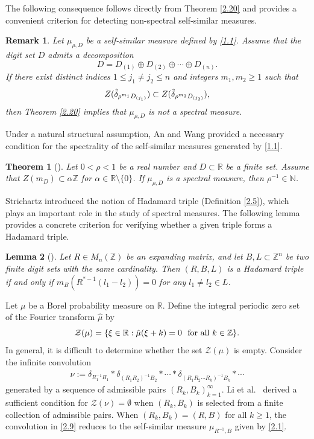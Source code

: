 \documentclass[11pt]{article}
\newtheorem{theorem}{Theorem}[section]
\newtheorem{lemma}[theorem]{Lemma}
\newtheorem{remark}{Remark}[section]
\numberwithin{equation}{section}
\begin{document}
The following consequence follows directly from Theorem \ref{2.20} and provides a convenient criterion for detecting non-spectral self-similar measures.
\begin{remark}\label{2.30}
	{\rm
Let $\mu_{\rho,D}$ be a self-similar measure defined by \eqref{1.1}. Assume that the digit set $D$ admits a decomposition 
$$D=D_{(1)} \oplus D_{(2)} \oplus \cdots \oplus D_{(n)}.$$
 If there exist distinct indices $1 \le j_1 \neq j_2 \le n$ and integers $m_1,m_2 \ge 1$ such that
\begin{equation}
	Z(\hat{\delta}_{\rho^{m_1}D_{(j_1)}}) \subset Z(\hat{\delta}_{\rho^{m_2}D_{(j_2)}}), \notag
\end{equation}
then Theorem \ref{2.20} implies that $\mu_{\rho,D}$ is not a spectral measure.}
\end{remark}


Under a natural structural assumption, An and Wang \cite{An2021} provided a necessary condition for the spectrality of the self-similar measures generated by \eqref{1.1}.
\begin{theorem}[\cite{An2021}] \label{2.4}
	Let $0< \rho <1$ be a real number and $D \subset \mathbb{R}$ be a finite set. Assume that $Z(m_D) \subset \alpha \mathbb{Z}$ for $\alpha \in \mathbb{R} \setminus \{0\}$. If $\mu_{\rho,D}$ is a spectral measure, then $\rho^{-1} \in \mathbb{N}$.
\end{theorem}

Strichartz \cite{Strichartz_2000} introduced the notion of  Hadamard triple (Definition \ref{2.5}), which plays an important role in the study of spectral measures. The following lemma provides a concrete criterion for verifying whether a given triple forms a Hadamard triple.
\begin{lemma}[\cite{Dut-Hau-Lai2019}]\label{lem2-6}
	Let $R\in M_n(\mathbb{Z})$ be an expanding matrix, and let $B,L\subset\mathbb{Z}^n$ be two finite digit sets with the same cardinality. Then $(R,B,L)$ is a Hadamard triple if and only if $m_B(R^{*-1}(l_1-l_2))=0$ for any $l_1\neq l_2\in L$.
\end{lemma}

Let $\mu$ be a Borel probability measure on $\mathbb{R}$. Define the integral periodic zero set of the Fourier transform $\hat{\mu}$ by
$$\mathcal{Z}(\mu)=\{ \xi \in  \mathbb{R}: \hat{\mu}(\xi +k)=0~~ {\rm{for~ all}} ~k \in \mathbb{Z} \}.$$
In general, it is difficult to determine whether the set $\mathcal{Z}(\mu)$ is empty. Consider the infinite convolution
\begin{align}\label{2.9}
	\nu:=\delta_{R_1^{-1}B_1}*\delta_{(R_1R_2)^{-1}B_2}*\cdots*\delta_{(R_1R_2\cdots R_k)^{-1}B_k}*\cdots
\end{align}
generated by a sequence of admissible pairs ${(R_k,B_k)}_{k=1}^{\infty}$. Li et al.~\cite{Li2024} derived a sufficient condition for $\mathcal{Z}(\nu)=\emptyset$ when $(R_k,B_k)$ is selected from a finite collection of admissible pairs.
When $(R_k,B_k)=(R,B)$ for all $k\geq 1$, the convolution in \eqref{2.9} reduces to the self-similar measure
$\mu_{R^{-1},B}$ given by \eqref{2.1}.
\end{document}
